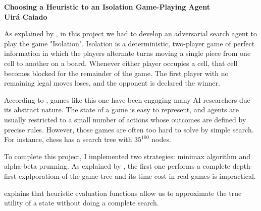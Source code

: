\documentclass[a4paper]{article}
\begin{document}

\begin{center}

{\bf \large Choosing a Heuristic to an Isolation Game-Playing Agent \\ \small Uirá Caiado}
\end{center}



As explained by \cite{Udacity2017}, in this project we had to develop an adversarial search agent to play the game "Isolation".  Isolation is a deterministic, two-player game of perfect information in which the players alternate turns moving a single piece from one cell to another on a board.  Whenever either player occupies a cell, that cell becomes blocked for the remainder of the game.  The first player with no remaining legal moves loses, and the opponent is declared the winner.


According to \cite{russelartificial}, games like this one have been engaging many AI researchers due its abstract nature. The state of a game is easy to represent, and agents are usually restricted to a small number of actions whose outcomes are defined by precise rules. However, those games are often too hard to solve by simple search. For instance, chess has a search tree with $35^{100}$ nodes.

To complete this project, I implemented two strategies: minimax algorithm and alpha-beta prunning. As explained by \cite{russelartificial}, the first one performs a complete depth-first explporatiom of the game tree and its time cost in real games is impractical.

explains that heuristic evaluation functions allow us to approximate the true utility of a state without doing a complete search.
































\end{document}
